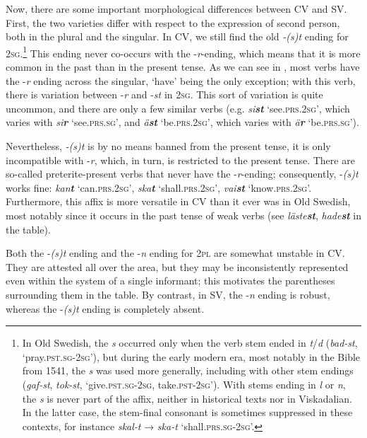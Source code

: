 \documentclass[output=paper,colorlinks,citecolor=brown,draft,draftmode]{langscibook}
\begin{document}
Now, there are some important morphological differences between CV and SV. First, the two varieties differ with respect to the expression of second person, both in the plural and the singular. In CV, we still find the old \textit{-(s)t} ending for 2\textsc{sg}.\footnote{In Old Swedish, the \textit{s} occurred only when the verb stem ended in \textit{t}/\textit{d} (\textit{bad-st}, ‘pray.\textsc{pst.sg}-\textsc{2sg}’), but during the early modern era, most notably in the Bible from 1541, the \textit{s} was used more generally, including with other stem endings (\textit{gaf-st}, \textit{tok-st}, ‘give.\textsc{pst.sg}-2\textsc{sg}, take.\textsc{pst}-\textsc{2sg}’). With stems ending in \textit{l} or \textit{n}, the \textit{s} is never part of the affix, neither in historical texts nor in Viskadalian. In the latter case, the stem-final consonant is sometimes suppressed in these contexts, for instance \textit{skal-t} → \textit{ska-t} ‘shall.\textsc{prs.sg}-2\textsc{sg}’.} This ending never co-occurs with the -\textit{r}-ending, which means that it is more common in the past than in the present tense. As we can see in , most verbs have the -\textit{r} ending across the singular, ‘have’ being the only exception; with this verb, there is variation between -\textit{r} and -\textit{st} in 2\textsc{sg}. This sort of variation is quite uncommon, and there are only a few similar verbs (e.g. \textit{si\textbf{{st}}} ‘see.\textsc{prs}.2\textsc{sg}’, which varies with \textit{si\textbf{{r}}} ‘see.\textsc{prs}.\textsc{sg}’, and \textit{ä\textbf{{st}}} ‘be.\textsc{prs.}2\textsc{sg}’, which varies with \textit{ä\textbf{{r}}} ‘be.\textsc{prs}.\textsc{sg}’).



Nevertheless, \textit{-(s)t} is by no means banned from the present tense, it is only incompatible with -\textit{r}, which, in turn, is restricted to the present tense. There are so-called preterite-present verbs that never have the -\textit{r}-ending; consequently, -\textit{(s)t} works fine: \textit{kan\textbf{{t}}} ‘can.\textsc{prs}.2\textsc{sg}’, \textit{ska\textbf{{t}}} ‘shall.\textsc{prs}.2\textsc{sg}’, \textit{vai\textbf{{st}}} ‘know.\textsc{prs.}2\textsc{sg}’. Furthermore, this affix is more versatile in CV than it ever was in Old Swedish, most notably since it occurs in the past tense of weak verbs (see \textit{läste\textbf{{st}}}, \textit{hade\textbf{{st}}} in the table).



Both the -\textit{(s)t} ending and the -\textit{n} ending for 2\textsc{pl} are somewhat unstable in CV. They are attested all over the area, but they may be inconsistently represented even within the system of a single informant; this motivates the parentheses surrounding them in the table. By contrast, in SV, the -\textit{n} ending is robust, whereas the -\textit{(s)t} ending is completely absent.
\end{document}

